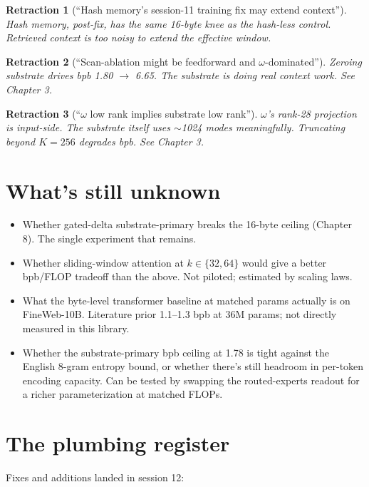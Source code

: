 \documentclass[11pt,openany]{book}
\newtheorem{retraction}{Retraction}[chapter]
\begin{document}
\begin{retraction}[``Hash memory's session-11 training fix may extend context'']
Hash memory, post-fix, has the same 16-byte knee as the hash-less control.
Retrieved context is too noisy to extend the effective window.
\end{retraction}

\begin{retraction}[``Scan-ablation might be feedforward and $\omega$-dominated'']
Zeroing substrate drives bpb 1.80 $\to$ 6.65. The substrate is doing real
context work. See Chapter 3.
\end{retraction}

\begin{retraction}[``$\omega$ low rank implies substrate low rank'']
$\omega$'s rank-28 projection is input-side. The substrate itself uses
$\sim$1024 modes meaningfully. Truncating beyond $K=256$ degrades bpb.
See Chapter 3.
\end{retraction}

\chapter{What's still unknown}

\begin{itemize}
  \item Whether gated-delta substrate-primary breaks the 16-byte ceiling
  (Chapter 8). The single experiment that remains.
  \item Whether sliding-window attention at $k \in \{32, 64\}$ would give
  a better bpb/FLOP tradeoff than the above. Not piloted; estimated by
  scaling laws.
  \item What the byte-level transformer baseline at matched params actually
  is on FineWeb-10B. Literature prior 1.1--1.3 bpb at 36M params; not
  directly measured in this library.
  \item Whether the substrate-primary bpb ceiling at 1.78 is tight against
  the English 8-gram entropy bound, or whether there's still headroom in
  per-token encoding capacity. Can be tested by swapping the routed-experts
  readout for a richer parameterization at matched FLOPs.
\end{itemize}

\chapter{The plumbing register}

Fixes and additions landed in session 12:
\end{document}
